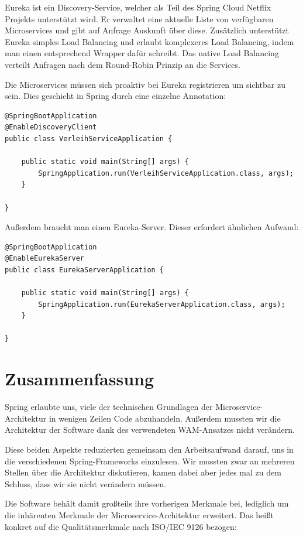 \documentclass{article}
\begin{document}
Eureka ist ein Discovery-Service, welcher als Teil des Spring Cloud Netflix Projekts unterstützt wird.
Er verwaltet eine aktuelle Liste von verfügbaren Microservices und gibt auf Anfrage Auskunft über diese.
Zusätzlich unterstützt Eureka simples Load Balancing und erlaubt komplexeres Load Balancing, indem man einen entsprechend Wrapper dafür schreibt.
Das native Load Balancing verteilt Anfragen nach dem Round-Robin Prinzip an die Services.

Die Microservices müssen sich proaktiv bei Eureka registrieren um sichtbar zu sein.
Dies geschieht in Spring durch eine einzelne Annotation:

\begin{lstlisting}
@SpringBootApplication
@EnableDiscoveryClient
public class VerleihServiceApplication {

	public static void main(String[] args) {
		SpringApplication.run(VerleihServiceApplication.class, args);
	}

}
\end{lstlisting}

Außerdem braucht man einen Eureka-Server.
Dieser erfordert ähnlichen Aufwand:

\begin{lstlisting}
@SpringBootApplication
@EnableEurekaServer
public class EurekaServerApplication {

	public static void main(String[] args) {
		SpringApplication.run(EurekaServerApplication.class, args);
	}

}
\end{lstlisting}

\section{Zusammenfassung}

Spring erlaubte uns, viele der technischen Grundlagen der Microservice-Architektur in wenigen Zeilen Code abzuhandeln.
Außerdem mussten wir die Architektur der Software dank des verwendeten WAM-Ansatzes nicht verändern.

Diese beiden Aspekte reduzierten gemeinsam den Arbeitsaufwand darauf, uns in die verschiedenen Spring-Frameworks einzulesen.
Wir mussten zwar an mehreren Stellen über die Architektur diskutieren, kamen dabei aber jedes mal zu dem Schluss, dass wir sie nicht verändern müssen.

Die Software behält damit großteils ihre vorherigen Merkmale bei, lediglich um die inhärenten Merkmale der Microservice-Architektur erweitert.
Das heißt konkret auf die Qualitätsmerkmale nach ISO/IEC 9126 bezogen:
\end{document}
